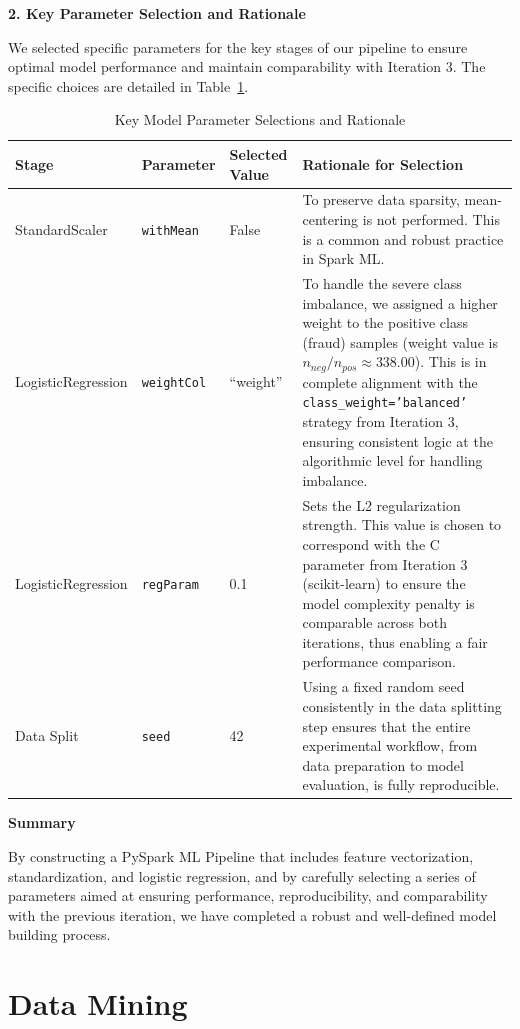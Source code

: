 \documentclass[sigplan,screen]{acmart}
\begin{document}
\textbf{2. Key Parameter Selection and Rationale}

We selected specific parameters for the key stages of our pipeline to ensure optimal model performance and maintain comparability with Iteration 3. The specific choices are detailed in Table~\ref{tab:parameter-selection}.

\begin{table}[h]
\centering
\caption{Key Model Parameter Selections and Rationale}
\label{tab:parameter-selection}
\begin{tabular}{|p{3cm}|p{2.5cm}|p{3cm}|p{7cm}|}
\hline
\textbf{Stage} & \textbf{Parameter} & \textbf{Selected Value} & \textbf{Rationale for Selection} \\
\hline
Standard\-Scaler & \texttt{withMean} & False & To preserve data sparsity, mean-centering is not performed. This is a common and robust practice in Spark ML. \\
\hline
Logistic\-Regression & \texttt{weightCol} & ``weight'' & To handle the severe class imbalance, we assigned a higher weight to the positive class (fraud) samples (weight value is $n_{neg} / n_{pos} \approx 338.00$). This is in complete alignment with the \texttt{class\_weight='balanced'} strategy from Iteration 3, ensuring consistent logic at the algorithmic level for handling imbalance. \\
\hline
Logistic\-Regression & \texttt{regParam} & 0.1 & Sets the L2 regularization strength. This value is chosen to correspond with the C parameter from Iteration 3 (scikit-learn) to ensure the model complexity penalty is comparable across both iterations, thus enabling a fair performance comparison. \\
\hline
Data Split & \texttt{seed} & 42 & Using a fixed random seed consistently in the data splitting step ensures that the entire experimental workflow, from data preparation to model evaluation, is fully reproducible. \\
\hline
\end{tabular}
\end{table}

\textbf{Summary}

By constructing a PySpark ML Pipeline that includes feature vectorization, standardization, and logistic regression, and by carefully selecting a series of parameters aimed at ensuring performance, reproducibility, and comparability with the previous iteration, we have completed a robust and well-defined model building process.

\section{Data Mining}
\end{document}
